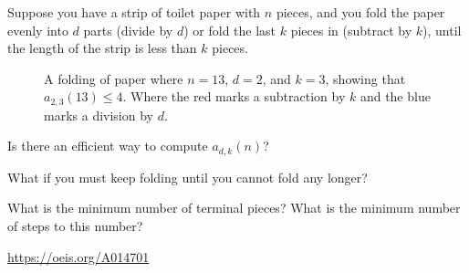 \documentclass{article}
\begin{document}
Suppose you have a strip of toilet paper with $n$ pieces, and you fold the
paper evenly into $d$ parts (divide by $d$) or fold the last $k$ pieces in
(subtract by $k$), until the length of the strip is less than $k$ pieces.
\begin{figure}[!h]
  \centering
  \caption{
    A folding of paper where $n = 13$, $d = 2$, and $k = 3$, showing that
    $a_{2,3}(13) \leq 4$.
    Where the red marks a subtraction by $k$ and the blue marks a division by $d$.
  }
\end{figure}

\begin{question}
  Is there an efficient way to compute $a_{d,k}(n)$?
\end{question}

\begin{related}
  \item What if you must keep folding until you cannot fold any longer?
  \item What is the minimum number of terminal pieces? What is the minimum number of steps to this number?
\end{related}

\begin{references}
  \item \url{https://oeis.org/A014701}
\end{references}
\end{document}
